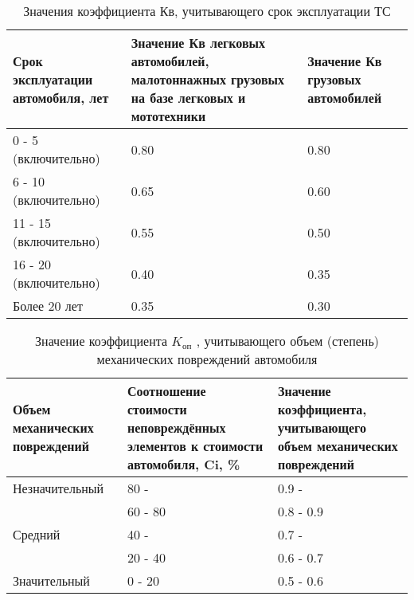 \noindent  \begin{table}[H]
  	 \label{tab:KB}
	\caption{\footnotesize {Значения коэффициента Кв, учитывающего срок эксплуатации ТС}}
		 \begin{tabular}{|p{47mm} |p{53mm}| p{50mm}|}
	\hline
 		Срок эксплуатации автомобиля, лет & Значение Кв легковых автомобилей, малотоннажных грузовых на базе легковых и мототехники & Значение Кв грузовых автомобилей \\ \hline
 		0 - 5 (включительно)   &0.80                                                                                    & 0.80                             \\ \hline
 		6 - 10 (включительно)             & 0.65                                                                                    & 0.60                             \\ \hline
 		11 - 15 (включительно)            & 0.55                                                                                    & 0.50                             \\ \hline
 		16 - 20 (включительно)            & 0.40                                                                                    & 0.35                             \\ \hline
 		Более 20 лет                      & 0.35                                                                                    & 0.30                            \\ \hline
 	\end{tabular}
\end{table}


\noindent \begin{table}[H]
	\label{tab:KO}
	\caption{\footnotesize {Значение коэффициента $ K_{\text{оп}} $ , учитывающего объем (степень) механических повреждений автомобиля}} 
	\centering
\begin{tabular}{|p{47mm}| p{53mm}| p{50mm}|}
	\hline
	Объем механических повреждений & Соотношение стоимости неповреждённых элементов к стоимости автомобиля, Ci, \% & Значение коэффициента, учитывающего объем механических повреждений \\ \hline
	Незначительный     & 80 -    & 0.9 -  \\
	& 60 - 80      & 0.8 - 0.9      \\
	Средний    & 40 -     & 0.7 -    \\
	& 20 - 40     & 0.6 - 0.7         \\
	Значительный                   & 0 - 20                                                                        & 0.5 - 0.6                                                          \\ \hline
\end{tabular}
\end{table}

